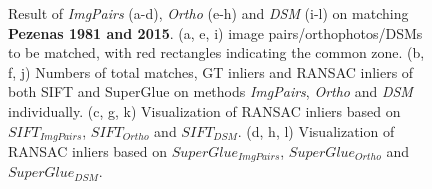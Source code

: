 \begin{figure}[htbp]
\begin{center}
{\begin{minipage}[t]{0.48\linewidth}
            \end{minipage}%
        }
        \caption{{\scriptsize Result of \textit{ImgPairs} (a-d), \textit{Ortho} (e-h) and \textit{DSM} (i-l) on matching \textbf{Pezenas 1981 and 2015}. (a, e, i) image pairs/orthophotos/DSMs to be matched, with red rectangles indicating the common zone. (b, f, j) Numbers of total matches, GT inliers and RANSAC inliers of both SIFT and SuperGlue on methods \textit{ImgPairs}, \textit{Ortho} and \textit{DSM} individually. (c, g, k) Visualization of RANSAC inliers based on $SIFT_{ImgPairs}$, $SIFT_{Ortho}$ and $SIFT_{DSM}$. (d, h, l) Visualization of RANSAC inliers based on $SuperGlue_{ImgPairs}$, $SuperGlue_{Ortho}$ and $SuperGlue_{DSM}$.}}        
        \label{MatchVizPezenas1981DSM}
    \end{center}
\end{figure} 



